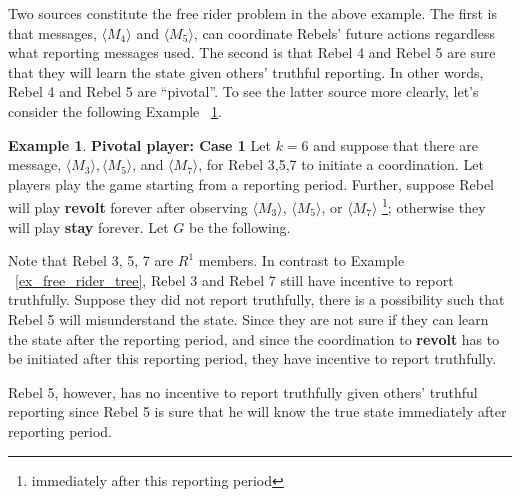 \documentclass[12pt,letterpaper]{article}
\theoremstyle{definition}
\newtheorem{example}{Example}[section]
\theoremstyle{remark}
\theoremstyle{claim}
\begin{document}
Two sources constitute the free rider problem in the above example. The first is that messages, $\langle M_4 \rangle$ and $\langle M_5 \rangle$, can coordinate Rebels' future actions regardless what reporting messages used. The second is that Rebel 4 and Rebel 5 are sure that they will learn the state given others' truthful reporting. In other words, Rebel 4 and Rebel 5 are ``pivotal''. To see the latter source more clearly, let's consider the following Example ~\ref{ex_pivotal_1}.



\begin{example} \label{ex_pivotal_1}\textbf{Pivotal player: Case 1}
Let $k=6$ and suppose that there are message, $\langle M_3 \rangle,\langle M_5 \rangle$, and $ \langle M_7 \rangle$, for Rebel 3,5,7 to initiate a coordination. Let players play the game starting from a reporting period. Further, suppose Rebel will play \textbf{revolt} forever after observing $\langle M_3 \rangle$, $\langle M_5 \rangle$, or $\langle M_7 \rangle$ \footnote{immediately after this reporting period}; otherwise they will play \textbf{stay} forever. Let $G$ be the following.
\begin{center}
\end{center}

Note that Rebel 3, 5, 7 are $R^1$ members. In contrast to Example ~\ref{ex_free_rider_tree}, Rebel 3 and Rebel 7 still have incentive to report truthfully. Suppose they did not report truthfully, there is a possibility such that Rebel 5 will misunderstand the state. Since they are not sure if they can learn the state after the reporting period, and since the coordination to \textbf{revolt} has to be initiated after this reporting period, they have incentive to report truthfully.

Rebel 5, however, has no incentive to report truthfully given others' truthful reporting since Rebel 5 is sure that he will know the true state immediately after reporting period.
\end{example}
   
\end{document}
